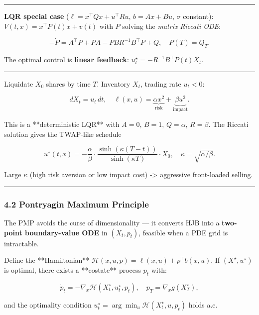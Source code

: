 \documentclass[11pt,a4paper]{article}
\begin{document}
\begin{center}\rule{0.5\linewidth}{0.5pt}\end{center}

\textbf{LQR special case} (\(\ell = x^\top Q x + u^\top R u\), \(b=Ax+Bu\), \(\sigma\) constant): \(V(t,x)=x^\top P(t)x + v(t)\) with \(P\) solving the \emph{matrix Riccati ODE}:

\[-\dot P = A^\top P + PA - PBR^{-1}B^\top P + Q,\quad P(T)=Q_T.\]

The optimal control is \textbf{linear feedback}: \(u^\star_t = -R^{-1}B^\top P(t)X_t\).

\begin{center}\rule{0.5\linewidth}{0.5pt}\end{center}

\begin{tcolorbox}[colback=notebg!60,colframe=optgreen,fonttitle=\bfseries\sffamily,title={\textsf{\textbf{Example}} — Example — Optimal Inventory (Almgren-Chriss liquidation)},breakable]
Liquidate $X_0$ shares by time $T$.  Inventory $X_t$, trading rate $u_t<0$:

$$dX_t = u_t\,dt, \quad
\ell(x,u) = \underbrace{\alpha x^2}_{\text{risk}} + \underbrace{\beta u^2}_{\text{impact}}.$$

This is a **deterministic LQR** with
$A=0$, $B=1$, $Q=\alpha$, $R=\beta$.
The Riccati solution gives the TWAP-like schedule

$$u^\star(t,x) = -\frac{\alpha}{\beta}\cdot\frac{\sinh(\kappa(T-t))}{\sinh(\kappa T)}\cdot X_0,
\quad \kappa=\sqrt{\alpha/\beta}.$$

Large $\kappa$ (high risk aversion or low impact cost) -> aggressive front-loaded selling.
\end{tcolorbox}

\begin{center}\rule{0.5\linewidth}{0.5pt}\end{center}

\subsubsection{4.2 Pontryagin Maximum Principle}\label{pontryagin-maximum-principle}

The PMP avoids the curse of dimensionality --- it converts HJB into a \textbf{two-point boundary-value ODE} in \((X_t, p_t)\), feasible when a PDE grid is intractable.

\begin{tcolorbox}[colback=thmbg!60,colframe=optgold,fonttitle=\bfseries\sffamily,title={\textsf{\textbf{Theorem / Key Idea}} — Theorem (PMP)},breakable]
Define the **Hamiltonian** $\mathcal{H}(x,u,p) = \ell(x,u)+p^\top b(x,u)$.
If $(X^\star, u^\star)$ is optimal, there exists a **costate** process $p_t$ with:

$$\dot p_t = -\nabla_x \mathcal{H}(X_t^\star, u_t^\star, p_t),\quad p_T = \nabla_x g(X_T^\star),$$

and the optimality condition $u_t^\star = \arg\min_u \mathcal{H}(X_t^\star, u, p_t)$ holds a.e.
\end{tcolorbox}
\end{document}
